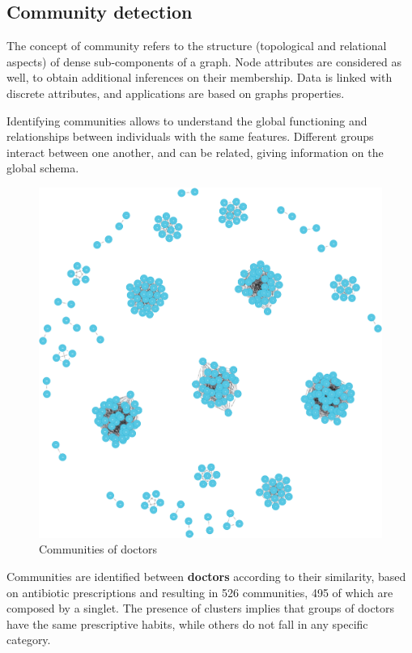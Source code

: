\subsection{Community detection}
The concept of community refers to the structure (topological and relational aspects) of dense sub-components of a graph. Node attributes are considered as well, to obtain additional inferences on their membership. Data is linked with discrete attributes, and applications are based on graphs properties.

Identifying communities allows to understand the global functioning and relationships between individuals with the same features. Different groups interact between one another, and can be related, giving information on the global schema.

\begin{figure}[h]
	\centering
	\includegraphics[scale=0.11]{./images/community-doctors.png}
	\caption{\small Communities of doctors}
\end{figure}

Communities are identified between \textbf{doctors} according to their similarity, based on antibiotic prescriptions and resulting in 526 communities, 495 of which are composed by a singlet. The presence of clusters implies that groups of doctors have the same prescriptive habits, while others do not fall in any specific category.

